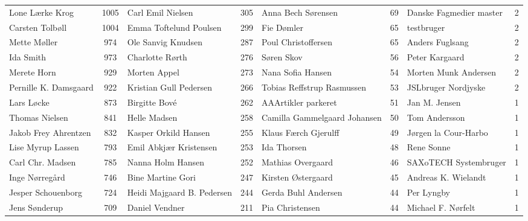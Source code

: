 \begin{table*}[h]
\begin{tabular}{l|c|l|c|l|c|l|c}
		Lone Lærke Krog       &  1005  & Carl Emil Nielsen          &  305   & Anna Bech Sørensen           &   69   & Danske Fagmedier master      &   2    \\
		Carsten Tolbøll       &  1004  & Emma Toftelund Poulsen     &  299   & Fie Dømler                   &   65   & testbruger                   &   2    \\
		Mette Møller          &  974   & Ole Sanvig Knudsen         &  287   & Poul Christoffersen          &   65   & Anders Fuglsang              &   2    \\
		Ida Smith             &  973   & Charlotte Rørth            &  276   & Søren Skov                   &   56   & Peter Kargaard               &   2    \\
		Merete Horn           &  929   & Morten Appel               &  273   & Nana Sofia Hansen            &   54   & Morten Munk Andersen         &   2    \\
		Pernille K. Damsgaard &  922   & Kristian Gull Pedersen     &  266   & Tobias Reffstrup Rasmussen   &   53   & JSLbruger Nordjyske          &   2    \\
		Lars Løcke            &  873   & Birgitte Bové              &  262   & AAArtikler parkeret          &   51   & Jan M. Jensen                &   1    \\
		Thomas Nielsen        &  841   & Helle Madsen               &  258   & Camilla Gammelgaard Johansen &   50   & Tom Andersson                &   1    \\
		Jakob Frey Ahrentzen  &  832   & Kasper Orkild Hansen       &  255   & Klaus Færch Gjerulff         &   49   & Jørgen la Cour-Harbo         &   1    \\
		Lise Myrup Lassen     &  793   & Emil Abkjær Kristensen     &  253   & Ida Thorsen                  &   48   & Rene Sonne                   &   1    \\
		Carl Chr. Madsen      &  785   & Nanna Holm Hansen          &  252   & Mathias Overgaard            &   46   & SAXoTECH Systembruger        &   1    \\
		Inge Nørregård        &  746   & Bine Martine Gori          &  247   & Kirsten Østergaard           &   45   & Andreas K. Wielandt          &   1    \\
		Jesper Schouenborg    &  724   & Heidi Majgaard B. Pedersen &  244   & Gerda Buhl Andersen          &   44   & Per Lyngby                   &   1    \\
		Jens Sønderup         &  709   & Daniel Vendner             &  211   & Pia Christensen              &   44   & Michael F. Nørfelt           &   1    \\

\end{tabular}
\end{table*}
